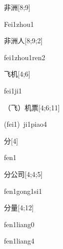 \begin{verbete}{非洲}[8;9]
\begin{pronuncia}{Fei1zhou1}
\end{pronuncia}
\end{verbete}

\begin{verbete}{非洲人}[8;9;2]
\begin{pronuncia}{fei1zhou1ren2}
\end{pronuncia}
\end{verbete}

\begin{verbete}[fei1ji1]{飞机}[4;6]
\begin{pronuncia}{fei1ji1}
\end{pronuncia}
\end{verbete}

\begin{verbete}{（飞）机票}[4;6;11]
\begin{pronuncia}[\\]{(fei1)\ ji1piao4}
\end{pronuncia}
\end{verbete}

\begin{verbete}[fen1]{分}[4]
\begin{pronuncia}{fen1}
\end{pronuncia}
\end{verbete}

\begin{verbete}{分公司}[4;4;5]
\begin{pronuncia}{fen1gong1si1}
\end{pronuncia}
\end{verbete}

\begin{verbete}{分量}[4;12]
\begin{pronuncia}{fen1liang0}
\end{pronuncia}
\begin{pronuncia}{fen1liang4}
\end{pronuncia}
\end{verbete}

